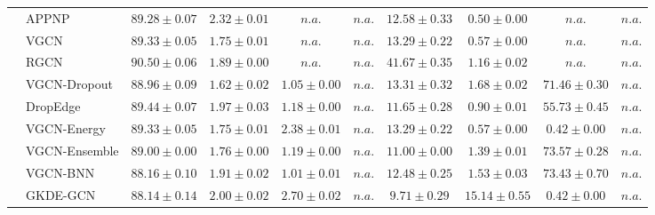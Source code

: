 \begin{table*}[!h]
{\begin{tabular}{ll|cccc|cccc}
        & APPNP & ${89.28\scriptscriptstyle \pm 0.07}$ & ${{2.32}\scriptscriptstyle \pm 0.01}$ & $n.a.$ & $n.a.$ & ${12.58\scriptscriptstyle \pm 0.33}$ & ${0.50\scriptscriptstyle \pm 0.00}$ & $n.a.$ & $n.a.$\\
        & VGCN & ${89.33\scriptscriptstyle \pm 0.05}$ & ${1.75\scriptscriptstyle \pm 0.01}$ & $n.a.$ & $n.a.$ & ${13.29\scriptscriptstyle \pm 0.22}$ & ${0.57\scriptscriptstyle \pm 0.00}$ & $n.a.$ & $n.a.$\\
        & RGCN & ${\mathbf{90.50}\scriptscriptstyle \pm 0.06}$ & ${1.89\scriptscriptstyle \pm 0.00}$ & $n.a.$ & $n.a.$ & ${41.67\scriptscriptstyle \pm 0.35}$ & ${1.16\scriptscriptstyle \pm 0.02}$ & $n.a.$ & $n.a.$\\
        & VGCN-Dropout & ${88.96\scriptscriptstyle \pm 0.09}$ & ${1.62\scriptscriptstyle \pm 0.02}$ & ${1.05\scriptscriptstyle \pm 0.00}$ & $n.a.$ & ${13.31\scriptscriptstyle \pm 0.32}$ & ${1.68\scriptscriptstyle \pm 0.02}$ & ${71.46\scriptscriptstyle \pm 0.30}$ & $n.a.$\\
        & DropEdge & ${89.44\scriptscriptstyle \pm 0.07}$ & ${1.97\scriptscriptstyle \pm 0.03}$ & ${1.18\scriptscriptstyle \pm 0.00}$ & $n.a.$ & ${11.65\scriptscriptstyle \pm 0.28}$ & ${0.90\scriptscriptstyle \pm 0.01}$ & ${55.73\scriptscriptstyle \pm 0.45}$ & $n.a.$\\
        & VGCN-Energy & ${89.33\scriptscriptstyle \pm 0.05}$ & ${1.75\scriptscriptstyle \pm 0.01}$ & ${2.38\scriptscriptstyle \pm 0.01}$ & $n.a.$ & ${13.29\scriptscriptstyle \pm 0.22}$ & ${0.57\scriptscriptstyle \pm 0.00}$ & ${0.42\scriptscriptstyle \pm 0.00}$ & $n.a.$\\
        & VGCN-Ensemble & ${89.00\scriptscriptstyle \pm 0.00}$ & ${1.76\scriptscriptstyle \pm 0.00}$ & ${1.19\scriptscriptstyle \pm 0.00}$ & $n.a.$ & ${11.00\scriptscriptstyle \pm 0.00}$ & ${1.39\scriptscriptstyle \pm 0.01}$ & ${{73.57}\scriptscriptstyle \pm 0.28}$ & $n.a.$\\
        & VGCN-BNN & ${88.16\scriptscriptstyle \pm 0.10}$ & ${1.91\scriptscriptstyle \pm 0.02}$ & ${1.01\scriptscriptstyle \pm 0.01}$ & $n.a.$ & ${12.48\scriptscriptstyle \pm 0.25}$ & ${1.53\scriptscriptstyle \pm 0.03}$ & ${73.43\scriptscriptstyle \pm 0.70}$ & $n.a.$\\
        & GKDE-GCN & ${88.14\scriptscriptstyle \pm 0.14}$ & ${2.00\scriptscriptstyle \pm 0.02}$ & ${{2.70}\scriptscriptstyle \pm 0.02}$ & $n.a.$ & ${9.71\scriptscriptstyle \pm 0.29}$ & ${{15.14}\scriptscriptstyle \pm 0.55}$ & ${0.42\scriptscriptstyle \pm 0.00}$ & $n.a.$\\

\end{tabular}}
\end{table*}
